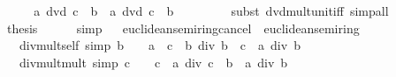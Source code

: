 \begin{isabellebody}
%
\isadelimproof
%
\endisadelimproof
%
\isatagproof
{}\isamarkupfalse%
\ {\isacharminus}{\kern0pt}\isanewline
\ \ \isamarkupfalse%
\ {\isachardoublequoteopen}a\ dvd\ c\ {\isacharminus}{\kern0pt}\ b\ {\isasymlongleftrightarrow}\ a\ dvd\ {\isacharparenleft}{\kern0pt}c\ {\isacharminus}{\kern0pt}\ b{\isacharparenright}{\kern0pt}\ {\isacharasterisk}{\kern0pt}\ {\isacharminus}{\kern0pt}\ {}{\isachardoublequoteclose}\isanewline
\ \ \ \ \isamarkupfalse%
\ {\isacharparenleft}{\kern0pt}subst\ dvd{\isacharunderscore}{\kern0pt}mult{\isacharunderscore}{\kern0pt}unit{\isacharunderscore}{\kern0pt}iff{\isacharparenright}{\kern0pt}\ simp{\isacharunderscore}{\kern0pt}all\isanewline
\ \ \isamarkupfalse%
\ \isamarkupfalse%
\ {\isacharquery}{\kern0pt}thesis\isanewline
\ \ \ \ \isamarkupfalse%
\ simp\isanewline
{}\isamarkupfalse%
%
\endisatagproof
{\isafoldproof}%
%
\isadelimproof
\isanewline
%
\endisadelimproof
\ \isanewline
{}\isamarkupfalse%
%
\isadelimdocument
%
\endisadelimdocument
%
\isatagdocument
%
\isamarkuptrue%
%
\endisatagdocument
{\isafolddocument}%
%
\isadelimdocument
%
\endisadelimdocument
{}\isamarkupfalse%
\ euclidean{\isacharunderscore}{\kern0pt}semiring{\isacharunderscore}{\kern0pt}cancel\ {\isacharequal}{\kern0pt}\ euclidean{\isacharunderscore}{\kern0pt}semiring\ {\isacharplus}{\kern0pt}\isanewline
\ \ \ div{\isacharunderscore}{\kern0pt}mult{\isacharunderscore}{\kern0pt}self{}\ {\isacharbrackleft}{\kern0pt}simp{\isacharbrackright}{\kern0pt}{\isacharcolon}{\kern0pt}\ {\isachardoublequoteopen}b\ {\isasymnoteq}\ {}\ {\isasymLongrightarrow}\ {\isacharparenleft}{\kern0pt}a\ {\isacharplus}{\kern0pt}\ c\ {\isacharasterisk}{\kern0pt}\ b{\isacharparenright}{\kern0pt}\ div\ b\ {\isacharequal}{\kern0pt}\ c\ {\isacharplus}{\kern0pt}\ a\ div\ b{\isachardoublequoteclose}\isanewline
\ \ \ div{\isacharunderscore}{\kern0pt}mult{\isacharunderscore}{\kern0pt}mult{}\ {\isacharbrackleft}{\kern0pt}simp{\isacharbrackright}{\kern0pt}{\isacharcolon}{\kern0pt}\ {\isachardoublequoteopen}c\ {\isasymnoteq}\ {}\ {\isasymLongrightarrow}\ {\isacharparenleft}{\kern0pt}c\ {\isacharasterisk}{\kern0pt}\ a{\isacharparenright}{\kern0pt}\ div\ {\isacharparenleft}{\kern0pt}c\ {\isacharasterisk}{\kern0pt}\ b{\isacharparenright}{\kern0pt}\ {\isacharequal}{\kern0pt}\ a\ div\ b{\isachardoublequoteclose}\isanewline

\end{isabellebody}
